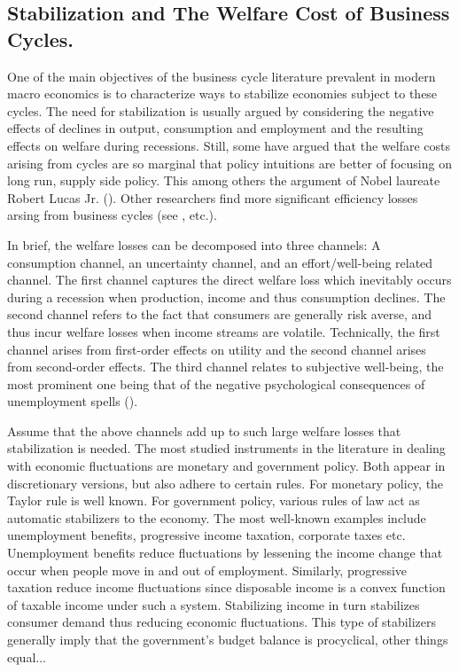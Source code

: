 \subsection{Stabilization and The Welfare Cost of Business Cycles.} One of the main objectives of the business cycle literature prevalent in modern macro economics is to characterize ways to stabilize economies subject to these cycles. 
The need for stabilization is usually argued by considering the negative effects of declines in output, consumption and employment and the resulting effects on welfare during recessions. Still, some have argued that the welfare costs arising from cycles are so marginal that policy intuitions are better of focusing on long run, supply side policy. This among others the argument of Nobel laureate Robert Lucas Jr. (\citet{lucas2003macroeconomic}). Other researchers find more significant efficiency losses arsing from business cycles (see \citet{gali2007markups}, \citet{tella2003macroeconomics} etc.). 


In brief, the welfare losses can be decomposed into three channels: A consumption channel, an uncertainty channel, and an effort/well-being related channel. The first channel captures the direct welfare loss which inevitably occurs during a recession when production, income and thus consumption declines. The second channel refers to the fact that consumers are generally risk averse, and thus incur welfare losses when income streams are volatile. Technically, the first channel arises from first-order effects on utility and the second channel arises from second-order effects. The third channel relates to subjective well-being, the most prominent one being that of the negative psychological consequences of unemployment spells (\citet{wolfers2003business}).

Assume that the above channels add up to such large welfare losses that stabilization is needed. The most studied instruments in the literature in dealing with economic fluctuations are monetary and government policy. Both appear in discretionary versions, but also adhere to certain rules. For monetary policy, the Taylor rule is well known. For government policy, various rules of law act as automatic stabilizers to the economy. The most well-known examples include unemployment benefits, progressive income taxation, corporate taxes etc. Unemployment benefits reduce fluctuations by lessening the income change that occur when people move in and out of employment. Similarly, progressive taxation reduce income fluctuations since disposable income is a convex function of taxable income under such a system.  Stabilizing income in turn stabilizes consumer demand thus reducing economic fluctuations. This type of stabilizers generally imply that the government's budget balance is procyclical, other things equal...   

